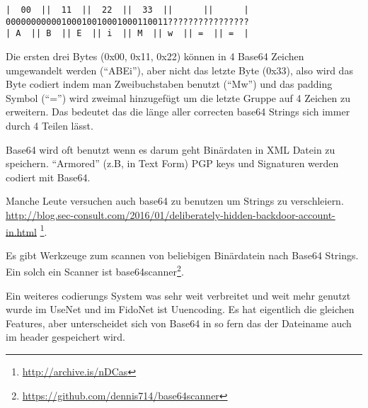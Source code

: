 \begin{lstlisting}
|  00  ||  11  ||  22  ||  33  ||      ||      |
00000000000100010010001000110011????????????????
| A  || B  || E  || i  || M  || w  || =  || =  |
\end{lstlisting}

Die ersten drei Bytes (0x00, 0x11, 0x22) können in 4 Base64 Zeichen umgewandelt werden (``ABEi''),
aber nicht das letzte Byte (0x33), also wird das Byte codiert indem man Zweibuchstaben 
benutzt (``Mw'') und das \gls{padding} Symbol (``='') wird zweimal hinzugefügt um die letzte
Gruppe auf 4 Zeichen zu erweitern. Das bedeutet das die länge aller correcten base64 Strings
sich immer durch 4 Teilen lässt. 


Base64 wird oft benutzt wenn es darum geht Binärdaten in  XML Datein zu speichern.
``Armored'' (z.B, in Text Form) PGP keys und Signaturen werden codiert mit Base64.


Manche Leute versuchen auch base64 zu benutzen um Strings zu verschleiern. 
\url{http://blog.sec-consult.com/2016/01/deliberately-hidden-backdoor-account-in.html}
\footnote{\url{http://archive.is/nDCas}}.

Es gibt Werkzeuge zum scannen von beliebigen Binärdatein nach Base64 Strings.
Ein solch ein Scanner ist base64scanner\footnote{\url{https://github.com/dennis714/base64scanner}}.

Ein weiteres codierungs System was sehr weit verbreitet und weit mehr genutzt wurde im UseNet und im 
FidoNet ist Uuencoding. Es hat eigentlich die gleichen Features, aber unterscheidet sich von Base64 
in so fern das der Dateiname auch im header gespeichert wird.

